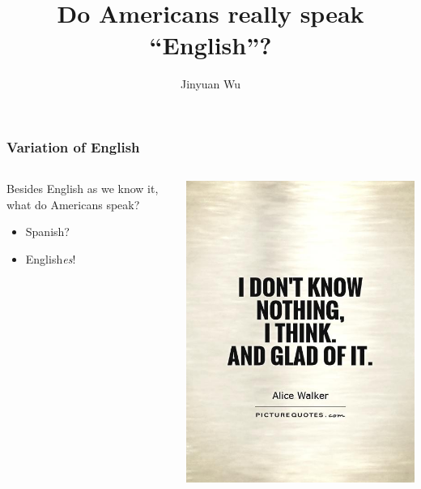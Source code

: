 \documentclass{beamer}
\title{Do Americans really speak ``English''?}
\author{Jinyuan Wu}
\begin{document}
    
\frame{\titlepage}

\begin{frame}
\frametitle{Variation of English}

\begin{columns}
    
\begin{column}{0.5\textwidth}
    Besides English as we know it, 
    what do Americans speak?

    \begin{itemize}
        \item Spanish? 
        \item English\emph{es}!
    \end{itemize}
\end{column}

\begin{column}{0.43\textwidth}
    \begin{center}
        \includegraphics[width=\textwidth]{pics/i-dont-know-nothing-i-think-and-glad-of-it-quote-1.jpg}
    \end{center}
\end{column}

\end{columns}


\end{frame}
\end{document}

